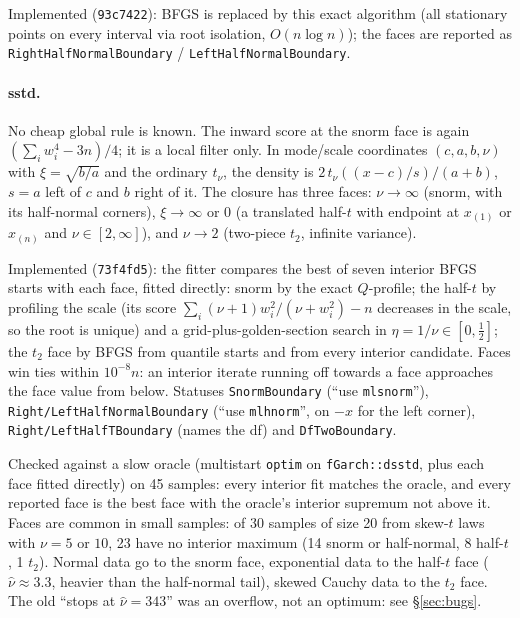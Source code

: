\documentclass[11pt]{article}
\newcommand{\code}[1]{\texttt{#1}}
\theoremstyle{plain}
\theoremstyle{definition}
\theoremstyle{remark}
\begin{document}
Implemented (\code{93c7422}): BFGS is replaced by this exact algorithm
(all stationary points on every interval via root isolation,
$O(n\log n)$); the faces are reported as \code{RightHalfNormalBoundary} /
\code{LeftHalfNormalBoundary}.

\paragraph{sstd.} No cheap global rule is known. The inward score at the
snorm face is again $(\sum_i w_i^4 - 3n)/4$; it is a local filter only. In
mode/scale coordinates $(c, a, b, \nu)$ with $\xi = \sqrt{b/a}$ and the
ordinary $t_\nu$, the density is $2\,t_\nu((x-c)/s)/(a+b)$, $s = a$ left of
$c$ and $b$ right of it. The closure has three faces: $\nu\to\infty$ (snorm,
with its half-normal corners), $\xi\to\infty$ or $0$ (a translated half-$t$
with endpoint at $x_{(1)}$ or $x_{(n)}$ and $\nu \in [2,\infty]$), and
$\nu\to2$ (two-piece $t_2$, infinite variance).

Implemented (\code{73f4fd5}): the fitter compares the best of seven interior
BFGS starts with each face, fitted directly: snorm by the exact $Q$-profile;
the half-$t$ by profiling the scale (its score
$\sum_i(\nu+1)w_i^2/(\nu+w_i^2) - n$ decreases in the scale, so the root is
unique) and a grid-plus-golden-section search in $\eta = 1/\nu \in
[0,\tfrac12]$; the $t_2$ face by BFGS from quantile starts and from every
interior candidate. Faces win ties within $10^{-8}n$: an interior iterate
running off towards a face approaches the face value from below. Statuses
\code{SnormBoundary} (``use \code{mlsnorm}''),
\code{Right/LeftHalfNormalBoundary} (``use \code{mlhnorm}'', on $-x$ for the
left corner), \code{Right/LeftHalfTBoundary} (names the df) and
\code{DfTwoBoundary}.

Checked against a slow oracle (multistart \code{optim} on
\code{fGarch::dsstd}, plus each face fitted directly) on 45 samples: every
interior fit matches the oracle, and every reported face is the best face
with the oracle's interior supremum not above it. Faces are common in small
samples: of 30 samples of size 20 from skew-$t$ laws with $\nu = 5$ or $10$,
23 have no interior maximum (14 snorm or half-normal, 8 half-$t$, 1 $t_2$).
Normal data go to the snorm face, exponential data to the half-$t$ face
($\hat\nu\approx3.3$, heavier than the half-normal tail), skewed Cauchy data
to the $t_2$ face. The old ``stops at $\hat\nu = 343$'' was an overflow, not
an optimum: see \S\ref{sec:bugs}.
\end{document}
